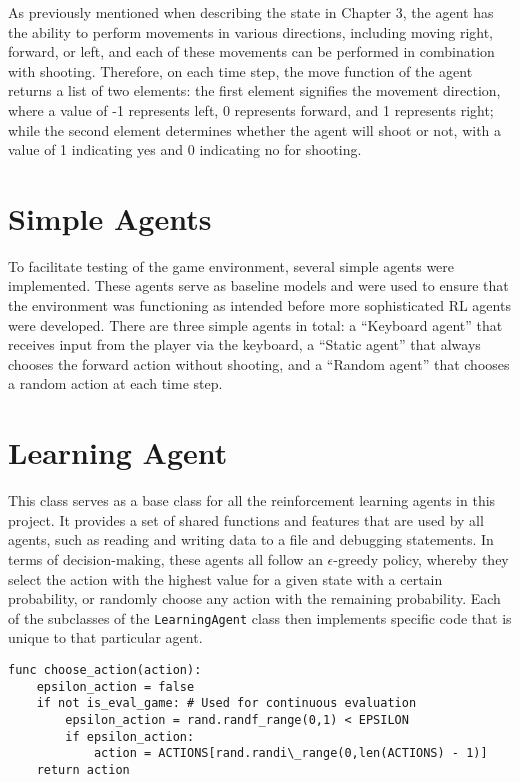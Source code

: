 As previously mentioned when describing the state in Chapter 3, the agent has the ability to perform movements in various directions, including moving right, forward, or left, and each of these movements can be performed in combination with shooting. Therefore, on each time step, the move function of the agent returns a list of two elements: the first element signifies the movement direction, where a value of -1 represents left, 0 represents forward, and 1 represents right; while the second element determines whether the agent will shoot or not, with a value of 1 indicating yes and 0 indicating no for shooting.


\section{Simple Agents}
To facilitate testing of the game environment, several simple agents were implemented. These agents serve as baseline models and were used to ensure that the environment was functioning as intended before more sophisticated RL agents were developed. There are three simple agents in total: a ``Keyboard agent'' that receives input from the player via the keyboard, a ``Static agent'' that always chooses the forward action without shooting, and a ``Random agent'' that chooses a random action at each time step. 

\section{Learning Agent}
This class serves as a base class for all the reinforcement learning agents in this project. It provides a set of shared functions and features that are used by all agents, such as reading and writing data to a file and debugging statements. In terms of decision-making, these agents all follow an $\epsilon$-greedy policy, whereby they select the action with the highest value for a given state with a certain probability, or randomly choose any action with the remaining probability. Each of the subclasses of the \texttt{LearningAgent} class then implements specific code that is unique to that particular agent.

\begin{center}
\hrulefill
\begin{lstlisting}
func choose_action(action):
    epsilon_action = false
    if not is_eval_game: # Used for continuous evaluation
        epsilon_action = rand.randf_range(0,1) < EPSILON
        if epsilon_action:
            action = ACTIONS[rand.randi\_range(0,len(ACTIONS) - 1)]  
    return action
\end{lstlisting}
\hrulefill
\end{center}

